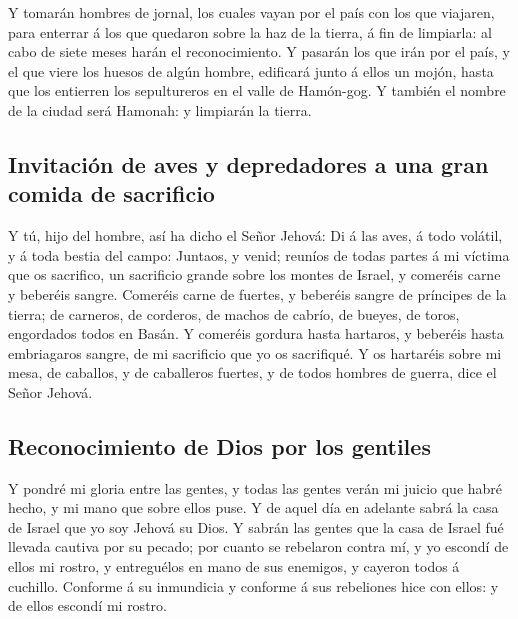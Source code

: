  Y tomarán hombres de jornal, los cuales vayan por el
país con los que viajaren, para enterrar á los que quedaron sobre la haz
de la tierra, á fin de limpiarla: al cabo de siete meses harán el
reconocimiento.  Y pasarán los que irán por el país, y el
que viere los huesos de algún hombre, edificará junto á ellos un mojón,
hasta que los entierren los sepultureros en el valle de Hamón-gog.
 Y también el nombre de la ciudad será Hamonah: y
limpiarán la tierra.

\hypertarget{invitaciuxf3n-de-aves-y-depredadores-a-una-gran-comida-de-sacrificio}{%
\subsection{Invitación de aves y depredadores a una gran comida de
sacrificio}\label{invitaciuxf3n-de-aves-y-depredadores-a-una-gran-comida-de-sacrificio}}

 Y tú, hijo del hombre, así ha dicho el Señor Jehová: Di
á las aves, á todo volátil, y á toda bestia del campo: Juntaos, y venid;
reuníos de todas partes á mi víctima que os sacrifico, un sacrificio
grande sobre los montes de Israel, y comeréis carne y beberéis sangre.
 Comeréis carne de fuertes, y beberéis sangre de
príncipes de la tierra; de carneros, de corderos, de machos de cabrío,
de bueyes, de toros, engordados todos en Basán.  Y
comeréis gordura hasta hartaros, y beberéis hasta embriagaros sangre, de
mi sacrificio que yo os sacrifiqué.  Y os hartaréis sobre
mi mesa, de caballos, y de caballeros fuertes, y de todos hombres de
guerra, dice el Señor Jehová.

\hypertarget{reconocimiento-de-dios-por-los-gentiles}{%
\subsection{Reconocimiento de Dios por los
gentiles}\label{reconocimiento-de-dios-por-los-gentiles}}

 Y pondré mi gloria entre las gentes, y todas las gentes
verán mi juicio que habré hecho, y mi mano que sobre ellos puse.
 Y de aquel día en adelante sabrá la casa de Israel que
yo soy Jehová su Dios.  Y sabrán las gentes que la casa
de Israel fué llevada cautiva por su pecado; por cuanto se rebelaron
contra mí, y yo escondí de ellos mi rostro, y entreguélos en mano de sus
enemigos, y cayeron todos á cuchillo.  Conforme á su
inmundicia y conforme á sus rebeliones hice con ellos: y de ellos
escondí mi rostro.

